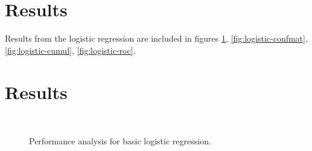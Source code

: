 \section{Results}
Results from the logistic regression are included in figures 
\ref{fig:logistic-basic}, \ref{fig:logistic-confmat}, \ref{fig:logistic-cumul}, 
\ref{fig:logistic-roc}.


\section{Results}
\begin{figure}[H]
\begin{center}
     \\
\end{center}
\caption[caption]{Performance analysis for basic logistic regression.}
\label{fig:logistic-basic}
\end{figure}
